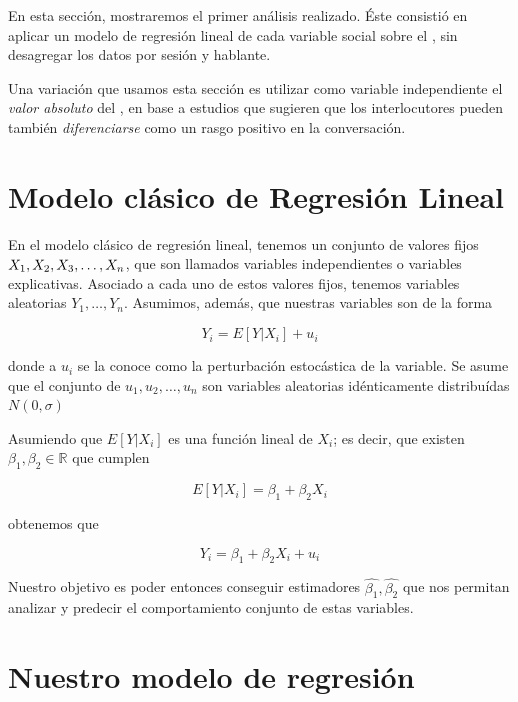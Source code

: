 En esta sección, mostraremos el primer análisis realizado. Éste consistió en aplicar un modelo de regresión lineal de cada variable social sobre el \entrainment, sin desagregar los datos por sesión y hablante.

Una variación que usamos esta sección es utilizar como variable independiente el \emph{valor absoluto} del \entrainment, en base a estudios que sugieren que los interlocutores pueden también \emph{diferenciarse} como un rasgo positivo en la conversación.

\section{Modelo clásico de Regresión Lineal}

En el modelo clásico de regresión lineal, tenemos un conjunto de valores fijos $X_1, X_2, \\ X_3, \ldots, X_n$, que son llamados variables independientes o variables explicativas. Asociado a cada uno de estos valores fijos, tenemos variables aleatorias $Y_1, \ldots, Y_n$. Asumimos, además, que nuestras variables son de la forma

\begin{equation}
  Y_i = E[Y|X_i] + u_i
\end{equation}

\noindent donde a $u_i$ se la conoce como la perturbación estocástica de la variable. Se asume que el conjunto de $u_1, u_2, \ldots, u_n$ son variables aleatorias idénticamente distribuídas $N(0, \sigma)$

Asumiendo que $E[Y|X_i]$ es una función lineal de $X_i$; es decir, que existen $\beta_1, \beta_2 \in \mathbb{R}$ que cumplen

\begin{equation}
  E[Y|X_i] = \beta_1 + \beta_2 X_i
\end{equation}

\noindent obtenemos que

\begin{equation}
  Y_i = \beta_1 + \beta_2 X_i + u_i
\end{equation}

Nuestro objetivo es poder entonces conseguir estimadores $\widehat{\beta_1}, \widehat{\beta_2}$ que nos permitan analizar y predecir el comportamiento conjunto de estas variables.


\section{Nuestro modelo de regresión}

